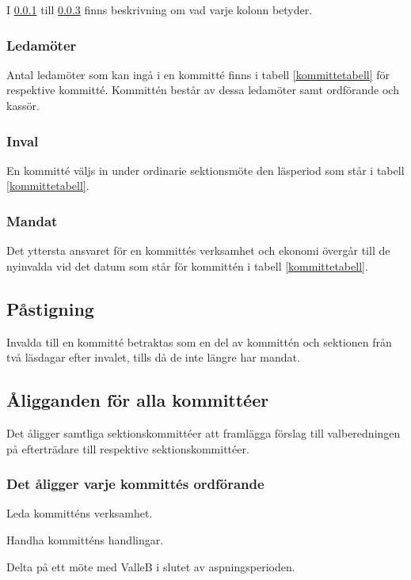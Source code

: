 I \ref{ledmot} till \ref{mandat} finns beskrivning om vad varje kolonn betyder. 

\subsubsection{Ledamöter} \label{ledmot}
Antal ledamöter som kan ingå i en kommitté finns i tabell \ref{kommittetabell} för respektive kommitté. Kommittén består av dessa ledamöter samt ordförande och kassör. 

\subsubsection{Inval}
En kommitté väljs in under ordinarie sektionsmöte den läsperiod som står i tabell \ref{kommittetabell}. 

\subsubsection{Mandat} \label{mandat}
Det yttersta ansvaret för en kommittés verksamhet och ekonomi övergår till de nyinvalda vid det datum som står för kommittén i tabell \ref{kommittetabell}.

\subsection{Påstigning}

Invalda till en kommitté betraktas som en del av kommittén och sektionen från två läsdagar efter invalet, tills då de inte längre har mandat.

\subsection{Åligganden för alla kommittéer}
Det åligger samtliga sektionskommittéer att framlägga förslag till valberedningen på efterträdare till respektive sektionskommittéer. 

\subsubsection{Det åligger varje kommittés ordförande}
\begin{att}
	\item Leda kommitténs verksamhet.
	\item Handha kommitténs handlingar.
	\item Delta på ett möte med ValleB i slutet av aspningsperioden.
\end{att}

